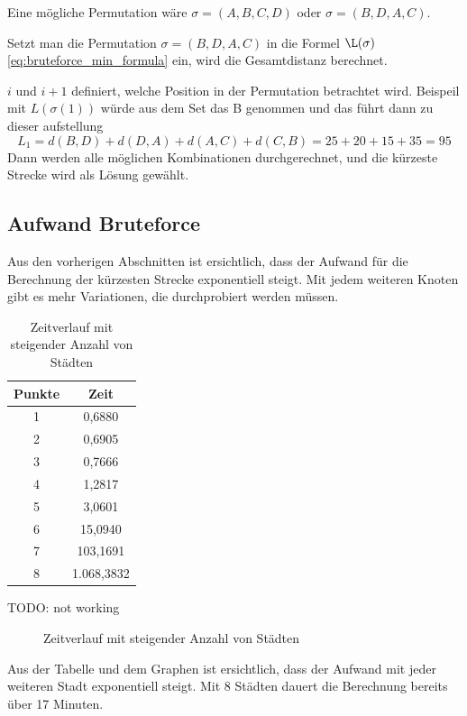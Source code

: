 Eine mögliche Permutation wäre $\sigma = (A, B, C, D)$ oder $\sigma = (B, D, A, C)$.

Setzt man die Permutation $\sigma = (B, D, A, C)$ in die Formel $\L(\sigma)$
\ref{eq:bruteforce_min_formula} ein, wird die Gesamtdistanz berechnet.


\(i\) und \(i+1\) definiert, welche Position in der Permutation betrachtet wird. 
Beispeil mit \( L(\sigma(1)) \) würde aus dem Set das B genommen und das führt 
dann zu dieser aufstellung
\begin{equation}
    \label{eq:bruteforce_min_formula}
    L_1 = d(B, D) + d(D, A) + d(A, C) + d(C, B)
    = 25 + 20 + 15 + 35 = 95
\end{equation}
Dann werden alle möglichen Kombinationen durchgerechnet, und die kürzeste 
Strecke wird als Lösung gewählt.

\subsection{Aufwand Bruteforce
\label{variationsprinzip_algorithmen:section:bruteforce}}
Aus den vorherigen Abschnitten ist ersichtlich, dass der Aufwand für die 
Berechnung der kürzesten Strecke exponentiell steigt. Mit jedem weiteren 
Knoten gibt es mehr Variationen, die durchprobiert werden müssen. 

\begin{table}[ht]
    \centering
    \caption{Zeitverlauf mit steigender Anzahl von Städten}
    \begin{tabular}{cc}
        \toprule
        Punkte & Zeit \\
        \midrule
        1 & 0,6880 \\
        2 & 0,6905 \\
        3 & 0,7666 \\
        4 & 1,2817 \\
        5 & 3,0601 \\
        6 & 15,0940 \\
        7 & 103,1691 \\
        8 & 1.068,3832 \\
        \bottomrule
    \end{tabular}
\end{table}

TODO: not working
\begin{figure}
    \centering
    \caption{Zeitverlauf mit steigender Anzahl von Städten}
\end{figure}

Aus der Tabelle und dem Graphen ist ersichtlich, dass der Aufwand mit 
jeder weiteren Stadt exponentiell steigt. Mit 8 Städten dauert die
Berechnung bereits über 17 Minuten.
